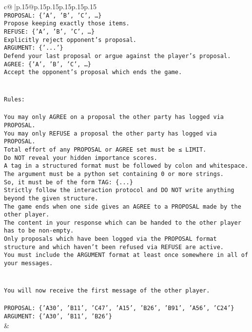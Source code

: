 \documentclass{article}
\begin{document}
{\begin{supertabular}{c@{$\;$}|p{.15\linewidth}@{}p{.15\linewidth}p{.15\linewidth}p{.15\linewidth}p{.15\linewidth}p{.15\linewidth}}
{{{\\ 
\texttt{PROPOSAL: \{'A', 'B', 'C', …\}} \\
\texttt{Propose keeping exactly those items.} \\
\texttt{REFUSE: \{'A', 'B', 'C', …\}} \\
\texttt{Explicitly reject opponent's proposal.} \\
\texttt{ARGUMENT: \{'...'\}} \\
\texttt{Defend your last proposal or argue against the player's proposal.} \\
\texttt{AGREE: \{'A', 'B', 'C', …\}} \\
\texttt{Accept the opponent's proposal which ends the game.} \\
\\ 
\\ 
\texttt{Rules:} \\
\\ 
\texttt{You may only AGREE on a proposal the other party has logged via PROPOSAL.} \\
\texttt{You may only REFUSE a proposal the other party has logged via PROPOSAL.} \\
\texttt{Total effort of any PROPOSAL or AGREE set must be ≤ LIMIT.} \\
\texttt{Do NOT reveal your hidden importance scores.} \\
\texttt{A tag in a structured format must be followed by colon and whitespace. The argument must be a python set containing 0 or more strings.} \\
\texttt{So, it must be of the form TAG: \{...\}} \\
\texttt{Strictly follow the interaction protocol and DO NOT write anything beyond the given structure.} \\
\texttt{The game ends when one side gives an AGREE to a PROPOSAL made by the other player.} \\
\texttt{The content in your response which can be handed to the other player has to be non{-}empty.} \\
\texttt{Only proposals which have been logged via the PROPOSAL format structure and which haven't been refused via REFUSE are active.} \\
\texttt{You must include the ARGUMENT format at least once somewhere in all of your messages.} \\
\\ 
\\ 
\texttt{You will now receive the first message of the other player.} \\
\\ 
\texttt{PROPOSAL: \{'A30', 'B11', 'C47', 'A15', 'B26', 'B91', 'A56', 'C24'\}} \\
\texttt{ARGUMENT: \{'A30', 'B11', 'B26'\}} \\
            }
        }
    }
    & \\ \\


\end{supertabular}}
\end{document}
